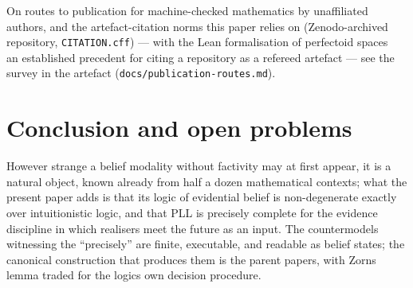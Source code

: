 On routes to publication for machine-checked mathematics by
unaffiliated authors, and the artefact-citation norms this paper relies
on (Zenodo-archived repository, \texttt{CITATION.cff}) --- with the
Lean formalisation of perfectoid
spaces~\cite{BuzzardCommelinMassot2020} an established precedent for
citing a repository as a refereed artefact --- see the survey in the
artefact (\texttt{docs/publication-routes.md}).

\section{Conclusion and open problems}\label{10-conclusion-and-open-problems}

However strange a belief modality without factivity may at first
appear, it is a natural object, known already from half a dozen
mathematical contexts; what the present paper adds is that its logic of
evidential belief is non-degenerate exactly over intuitionistic logic,
and that PLL is precisely complete for the evidence discipline in which
realisers meet the future as an input. The countermodels witnessing the
``precisely'' are finite, executable, and readable as belief states; the
canonical construction that produces them is the parent paper\textquotesingle s, with
Zorn\textquotesingle s lemma traded for the logic\textquotesingle s own decision procedure.

